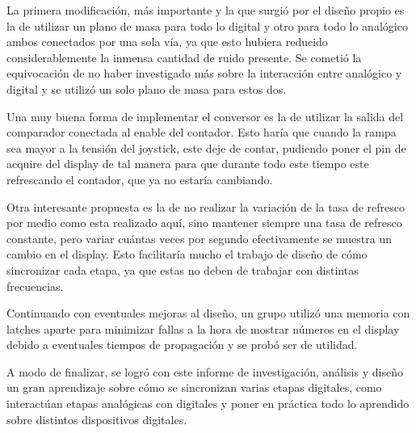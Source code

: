 La primera modificación, más importante y la que surgió por el diseño propio es la de utilizar un plano de masa para todo lo digital y otro para todo lo analógico ambos conectados por una sola vía, ya que esto hubiera reducido considerablemente la inmensa cantidad de ruido presente. Se cometió la equivocación de no haber investigado más sobre la interacción entre analógico y digital y se utilizó un solo plano de masa para estos dos.

Una muy buena forma de implementar el conversor es la de utilizar la salida del comparador conectada al enable del contador. Esto haría que cuando la rampa sea mayor a la tensión del joystick, este deje de contar, pudiendo poner el pin de acquire del display de tal manera para que durante todo este tiempo este refrescando el contador, que ya no estaría cambiando.

Otra interesante propuesta es la de no realizar la variación de la tasa de refresco por medio  como esta realizado aquí, sino mantener siempre una tasa de refresco constante, pero variar cuántas veces por segundo efectivamente se muestra un cambio en el display. Esto facilitaría mucho el trabajo de diseño de cómo sincronizar cada etapa, ya que estas no deben de trabajar con distintas frecuencias.

Continuando con eventuales mejoras al diseño, un grupo utilizó una memoria con latches aparte para minimizar fallas a la hora de mostrar números en el display debido a eventuales tiempos de propagación y se probó ser de utilidad.

A modo de finalizar, se logró con este informe de investigación, análisis y diseño un gran aprendizaje sobre cómo se sincronizan varias etapas digitales, como interactúan etapas analógicas con digitales y poner en práctica todo lo aprendido sobre distintos dispositivos digitales.

